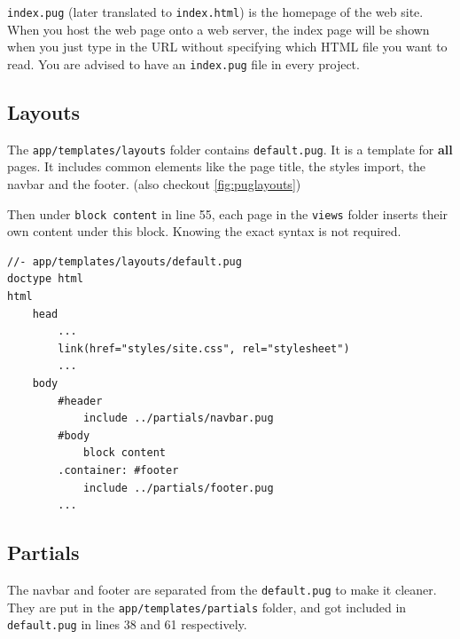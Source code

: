 \texttt{index.pug} (later translated to \texttt{index.html}) is the homepage of the web site. When you host the web page onto a web server, the index page will be shown when you just type in the URL without specifying which HTML file you want to read. You are advised to have an \texttt{index.pug} file in every project.

\subsection*{Layouts}
\label{sec:puglayouts}

The \texttt{app/templates/layouts} folder contains \texttt{default.pug}. It is a template for \textbf{all} pages. It includes common elements like the page title, the styles import, the navbar and the footer. (also checkout \cref{fig:puglayouts})

Then under \texttt{block content} in line 55, each page in the \texttt{views} folder inserts their own content under this block. Knowing the exact syntax is not required.

\begin{lstlisting}[language=pug]
//- app/templates/layouts/default.pug
doctype html
html
	head
		...
		link(href="styles/site.css", rel="stylesheet")
		...
	body
		#header
			include ../partials/navbar.pug
		#body
			block content
		.container: #footer
			include ../partials/footer.pug
        ...
\end{lstlisting}

\subsection*{Partials}

The navbar and footer are separated from the \texttt{default.pug} to make it cleaner. They are put in the \texttt{app/templates/partials} folder, and got included in \texttt{default.pug} in lines 38 and 61 respectively.

